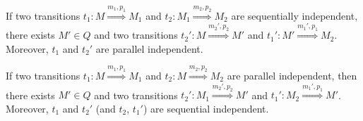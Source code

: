 \begin{lemma}
  \label{church_rosser}
  If two transitions $t_1:M\overset{m_1,p_1}{\Rightarrow} M_1$ and $t_2:M_1\overset{m_2,p_2}{\Rightarrow} M_2$ are sequentially independent, there exists $M'\in Q$ and two transitions $t_2':M\overset{m_2',p_2}{\Rightarrow} M'$ and $t_1':M'\overset{m_1',p_1}{\Rightarrow} M_2$. Moreover, $t_1$ and $t_2'$ are parallel independent.

If two transitions $t_1:M\overset{m_1,p_1}{\Rightarrow} M_1$ and $t_2:M\overset{m_2,p_2}{\Rightarrow} M_2$ are parallel independent, then there exists $M'\in Q$ and two transitions $t_2':M_1\overset{m_2',p_2}{\Rightarrow} M'$ and $t_1':M_2\overset{m_1',p_1}{\Rightarrow} M'$. Moreover, $t_1$ and $t_2'$ (and $t_2$, $t_1'$) are sequential independent.
\end{lemma}


